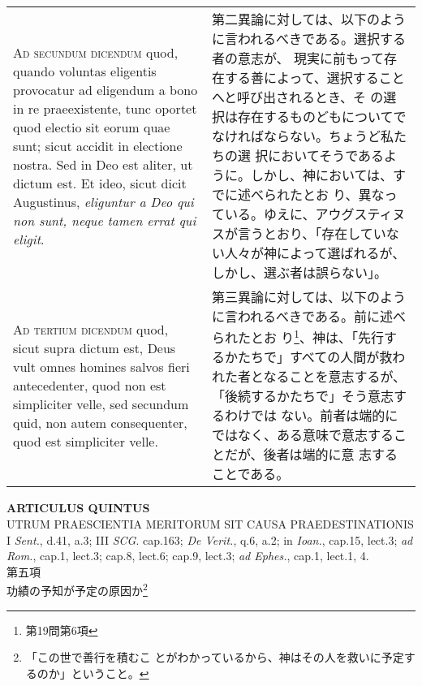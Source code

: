 \documentclass[10pt]{jsarticle} %
\begin{document}
\begin{longtable}{p{21em}p{21em}}
{\scshape Ad secundum dicendum} quod, quando voluntas
 eligentis provocatur ad eligendum a bono in re praeexistente, tunc
 oportet quod electio sit eorum quae sunt; sicut accidit in electione
 nostra. Sed in Deo est aliter, ut dictum est. Et ideo, sicut dicit
 Augustinus, {\itshape eliguntur a Deo qui non sunt, neque tamen errat qui eligit}.


&

第二異論に対しては、以下のように言われるべきである。選択する者の意志が、
現実に前もって存在する善によって、選択することへと呼び出されるとき、そ
の選択は存在するものどもについてでなければならない。ちょうど私たちの選
択においてそうであるように。しかし、神においては、すでに述べられたとお
り、異なっている。ゆえに、アウグスティヌスが言うとおり、「存在していな
い人々が神によって選ばれるが、しかし、選ぶ者は誤らない」。


\\



{\scshape Ad tertium dicendum} quod, sicut supra dictum
 est, Deus vult omnes homines salvos fieri antecedenter, quod non est
 simpliciter velle, sed secundum quid, non autem consequenter, quod est
 simpliciter velle.


&

第三異論に対しては、以下のように言われるべきである。前に述べられたとお
り\footnote{第19問第6項}、神は、「先行するかたちで」すべての人間が救わ
れた者となることを意志するが、「後続するかたちで」そう意志するわけでは
ない。前者は端的にではなく、ある意味で意志することだが、後者は端的に意
志することである。





\end{longtable}
\newpage




\begin{center}
 {\Large {\bf ARTICULUS QUINTUS}}\\
 {\large UTRUM PRAESCIENTIA MERITORUM SIT CAUSA PRAEDESTINATIONIS}\\
 {\footnotesize I {\itshape Sent.}, d.41, a.3; III {\itshape
 SCG}. cap.163; {\itshape De Verit.}, q.6, a.2; in {\itshape Ioan.},
 cap.15, lect.3; {\itshape ad Rom.}, cap.1, lect.3; cap.8, lect.6;
 cap.9, lect.3; {\itshape ad Ephes.}, cap.1, lect.1, 4.}\\
 {\Large 第五項\\功績の予知が予定の原因か}\footnote{「この世で善行を積むこ
 とがわかっているから、神はその人を救いに予定するのか」ということ。}
\end{center}
\end{document}
